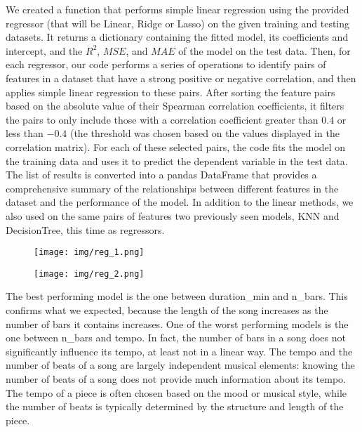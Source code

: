 We created a function that performs simple linear regression using the provided regressor (that will be Linear, Ridge or Lasso) on the given training and testing datasets. It returns a dictionary containing the fitted model, its coefficients and intercept, and the $R^2$, $MSE$, and $MAE$ of the model on the test data. Then, for each regressor, our code performs a series of operations to identify pairs of features in a dataset that have a strong positive or negative correlation, and then applies simple linear regression to these pairs. After sorting the feature pairs based on the absolute value of their Spearman correlation coefficients, it filters the pairs to only include those with a correlation coefficient greater than $0.4$ or less than $-0.4$ (the threshold was chosen based on the values displayed in the correlation matrix). For each of these selected pairs, the code fits the model on the training data and uses it to predict the dependent variable in the test data. The list of results is converted into a pandas DataFrame that provides a comprehensive summary of the relationships between different features in the dataset and the performance of the model. In addition to the linear methods, we also used on the same pairs of features two previously seen models, KNN and DecisionTree, this time as regressors.
\begin{figure}[H]
\centering
\begin{minipage}{.5\textwidth}
  \centering
  \texttt{[image: img/reg\_1.png]}
  \label{fig:test1}
\end{minipage}%
\begin{minipage}{.5\textwidth}
  \centering
  \texttt{[image: img/reg\_2.png]}
  \label{fig:test2}
\end{minipage}
\end{figure}
\noindent The best performing model is the one between duration\_min and n\_bars. This confirms what we expected, because the length of the song increases as the number of bars it contains increases. One of the worst performing models is the one between n\_bars and tempo. In fact, the number of bars in a song does not significantly influence its tempo, at least not in a linear way. The tempo and the number of beats of a song are largely independent musical elements: knowing the number of beats of a song does not provide much information about its tempo. The tempo of a piece is often chosen based on the mood or musical style, while the number of beats is typically determined by the structure and length of the piece.
